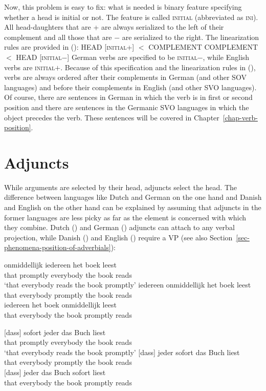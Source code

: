 Now, this problem is easy to fix: what is needed is binary feature specifying whether a head is
initial or not. The feature is called \textsc{initial} (abbreviated as \textsc{ini}). All
head-daughters that are \ini{}+ are always serialized to the left of their complement and all those
that are \ini{}$-$ are serialized to the right. The linearization rules are provided in ():
\eal
\label{lp-regeln}
\ex HEAD [\textsc{initial}+] $<$ COMPLEMENT
\ex COMPLEMENT $<$  HEAD [\textsc{initial}$-$]
\zl
German verbs are specified to be \textsc{initial}$-$, while English verbs are
\textsc{initial}$+$. Because of this specification and the linearization rules in (), verbs
are always ordered after their complements in German (and other SOV languages) and before their
complements in English (and other SVO languages). Of course, there are sentences in German in which
the verb is in first or second position and there are sentences in the Germanic SVO languages in
which the object precedes the verb. These sentences will be covered in Chapter~\ref{chap-verb-position}.


\section{Adjuncts}

While arguments are selected by their head, adjuncts select the head. The difference between
languages like Dutch and German on the one hand and Danish and English on the other hand can be
explained by assuming that adjuncts in the former languages are less picky as far as the element is
concerned with which they combine. Dutch () and German ()
adjuncts can attach to any verbal projection, while Danish () and English () require a
VP (see also Section~\ref{sec-phenomena-position-of-adverbials}):

\eal
\ex 
\gll [dat] onmiddellijk iedereen het boek leest\\
     \spacebr{}that promptly everybody the book reads\\\dutch
\glt `that everybody reads the book promptly'
\ex
\gll [dat] iedereen onmiddellijk het boek leest\\ 
     \spacebr{}that everybody promptly the book reads\\ 
\ex
\gll [dat] iedereen het boek onmiddellijk leest\\ 
    \spacebr{}that everybody the book promptly reads\\
\zl

\eal
\ex
\label{ex-m-j-b-l} 
\gll {}[dass] sofort jeder das Buch liest\\
     \spacebr{}that promptly everybody the book reads\\\german
\glt `that everybody reads the book promptly'
\ex
\label{ex-j-m-b-l} 
\gll {}[dass] jeder sofort das Buch liest\\
     \spacebr{}that everybody promptly the book reads\\ 
\ex
\label{ex-j-b-m-l}
\gll {}[dass] jeder das Buch sofort liest\\
    \spacebr{}that everybody the book promptly reads\\
\zl


